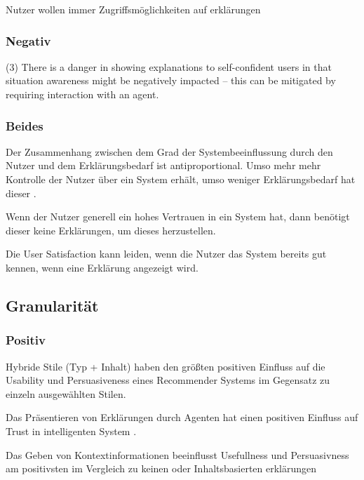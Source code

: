 Nutzer wollen immer Zugriffsmöglichkeiten auf erklärungen \cite{chazette_end-users_nodate}

\subsubsection*{Negativ}

(3) There is a danger in showing explanations to self-confident users in that situation awareness might be negatively impacted – this can be mitigated by requiring interaction with an agent. \cite{schaffer_i_2019}

\subsubsection*{Beides}

Der Zusammenhang zwischen dem Grad der Systembeeinflussung durch den Nutzer und dem Erklärungsbedarf ist antiproportional. Umso mehr mehr Kontrolle der Nutzer über ein System erhält, umso weniger Erklärungsbedarf hat dieser \cite{rosenfeld_explainability_2019}.

Wenn der Nutzer generell ein hohes Vertrauen in ein System hat, dann benötigt dieser keine Erklärungen, um dieses herzustellen. \cite{rosenfeld_explainability_2019, doshi2017towards}

Die User Satisfaction kann leiden, wenn die Nutzer das System bereits gut kennen, wenn eine Erklärung angezeigt wird.

\subsection*{Granularität}

\subsubsection*{Positiv}

Hybride Stile (Typ + Inhalt) haben den größten positiven Einfluss auf die Usability und Persuasiveness eines Recommender Systems im Gegensatz zu einzeln ausgewählten Stilen. \cite{sato_action-triggering_2019, kunkel_let_2019, sato_action-triggering_2019, schrills_color_2020, lim_2009_assessing}

Das Präsentieren von Erklärungen durch Agenten hat einen positiven Einfluss auf Trust in intelligenten System \cite{weitz_you_2019}.

Das Geben von Kontextinformationen beeinflusst Usefullness und Persuasivness am positivsten im Vergleich zu keinen oder Inhaltsbasierten erklärungen \cite{sato_action-triggering_2019}

